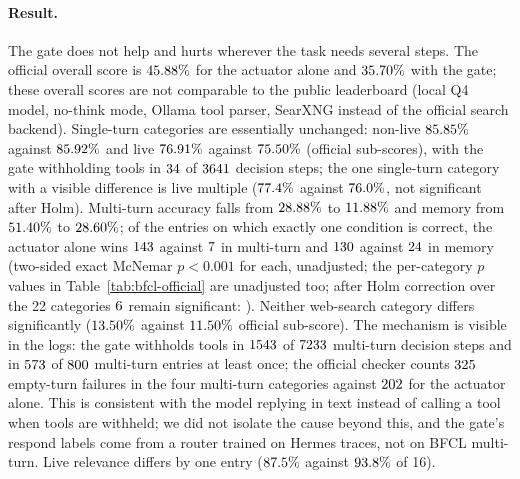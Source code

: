 \documentclass[10pt,twocolumn,letterpaper]{article}
\begin{document}
\paragraph{Result.} The gate does not help and hurts wherever the task needs several steps. The official overall score is $45.88\%$ for the actuator alone and $35.70\%$ with the gate; these overall scores are not comparable to the public leaderboard (local Q4 model, no-think mode, Ollama tool parser, SearXNG instead of the official search backend). Single-turn categories are essentially unchanged: non-live $85.85\%$ against $85.92\%$ and live $76.91\%$ against $75.50\%$ (official sub-scores), with the gate withholding tools in $34$ of $3641$ decision steps; the one single-turn category with a visible difference is live multiple ($77.4\%$ against $76.0\%$, not significant after Holm). Multi-turn accuracy falls from $28.88\%$ to $11.88\%$ and memory from $51.40\%$ to $28.60\%$; of the entries on which exactly one condition is correct, the actuator alone wins $143$ against $7$ in multi-turn and $130$ against $24$ in memory (two-sided exact McNemar $p<0.001$ for each, unadjusted; the per-category $p$ values in Table~\ref{tab:bfcl-official} are unadjusted too; after Holm correction over the 22 categories $6$ remain significant: \bfHolmList{}). Neither web-search category differs significantly ($13.50\%$ against $11.50\%$ official sub-score). The mechanism is visible in the logs: the gate withholds tools in $1543$ of $7233$ multi-turn decision steps and in $573$ of $800$ multi-turn entries at least once; the official checker counts $325$ empty-turn failures in the four multi-turn categories against $202$ for the actuator alone. This is consistent with the model replying in text instead of calling a tool when tools are withheld; we did not isolate the cause beyond this, and the gate's respond labels come from a router trained on Hermes traces, not on BFCL multi-turn. Live relevance differs by one entry ($87.5\%$ against $93.8\%$ of 16).
\end{document}
